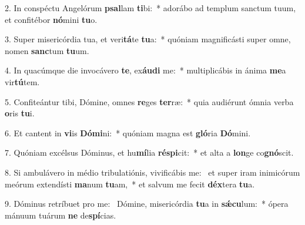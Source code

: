 2. In conspéctu Angelórum \textbf{psal}lam \textbf{ti}bi:~*  adorábo ad templum sanctum tuum, et confitébor \textbf{nó}mini \textbf{tu}o.\

3. Super misericórdia tua, et veri\textbf{tá}te \textbf{tu}a:~*  quóniam magnificásti super omne, nomen \textbf{sanc}tum \textbf{tu}um.\

4. In quacúmque die invocávero \textbf{te}, ex\textbf{áu}\textbf{di} me:~*  multiplicábis in ánima \textbf{me}a vir\textbf{tú}tem.\

5. Confiteántur tibi, Dómine, omnes \textbf{re}ges \textbf{ter}ræ:~*  quia audiérunt ómnia verba \textbf{o}ris \textbf{tu}i.\

6. Et cantent in \textbf{vi}is \textbf{Dó}\textbf{mi}ni:~*  quóniam magna est \textbf{gló}ria \textbf{Dó}mini.\

7. Quóniam excélsus Dóminus, et hu\textbf{mí}lia \textbf{ré}\textbf{spi}cit:~*  et alta a \textbf{lon}ge co\textbf{gnó}scit.\

8. Si ambulávero in médio tribulatiónis, vivificábis me: \dag\  et super iram inimicórum meórum extendísti \textbf{ma}num \textbf{tu}am,~*  et salvum me fecit \textbf{déx}tera \textbf{tu}a.\

9. Dóminus retríbuet pro me: \dag\  Dómine, misericórdia \textbf{tu}a in \textbf{sǽ}\textbf{cu}lum:~*  ópera mánuum tuárum \textbf{ne} de\textbf{spí}cias.\

